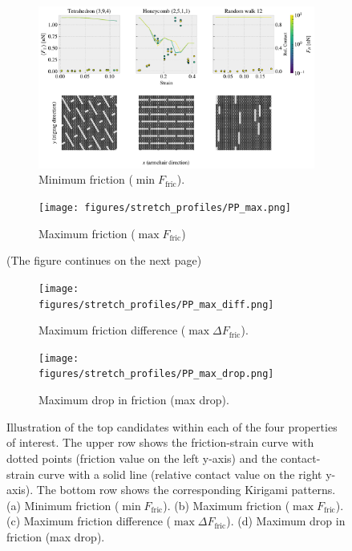 \begin{figure}[H]
  \centering
  \begin{subfigure}[t]{1\textwidth}
      \centering
      \includegraphics[width=\linewidth]{figures/stretch_profiles/PP_min.pdf}
      \caption{Minimum friction ($\min F_{\text{fric}}$).}
      \label{fig:PP_min}
  \end{subfigure}
  \hfill
  \vspace{1cm}
  \begin{subfigure}[t]{1\textwidth}
      \centering
      \texttt{[image: figures/stretch\_profiles/PP\_max.png]}
      \caption{Maximum friction ($\max F_{\text{fric}}$)}
      \label{fig:PP_max}
  \end{subfigure}
  \hfill
  \caption{(The figure continues on the next page)}
\end{figure}

\begin{figure}[H]\ContinuedFloat
  \centering
  \begin{subfigure}[t]{1\textwidth}
      \centering
      \texttt{[image: figures/stretch\_profiles/PP\_max\_diff.png]}
      \caption{Maximum friction difference ($\max \Delta F_{\text{fric}}$).}
      \label{fig:PP_max_diff}
  \end{subfigure}
  \hfill
  \vspace{1cm}
  \begin{subfigure}[t]{1\textwidth}
      \centering
      \texttt{[image: figures/stretch\_profiles/PP\_max\_drop.png]}
      \caption{Maximum drop in friction (max drop).}
      \label{fig:PP_max_drop}
  \end{subfigure}
  \hfill
  \caption{Illustration of the top candidates within each of the four properties of interest. The upper row shows the friction-strain curve with dotted points (friction value on the left y-axis) and the contact-strain curve with a solid line (relative contact value on the right y-axis). The bottom row shows the corresponding Kirigami patterns. (a) Minimum friction ($\min F_{\text{fric}}$). (b) Maximum friction ($\max F_{\text{fric}}$). (c) Maximum friction difference ($\max \Delta F_{\text{fric}}$).  (d) Maximum drop in friction (max drop). }
  \label{fig:PP}
\end{figure}


